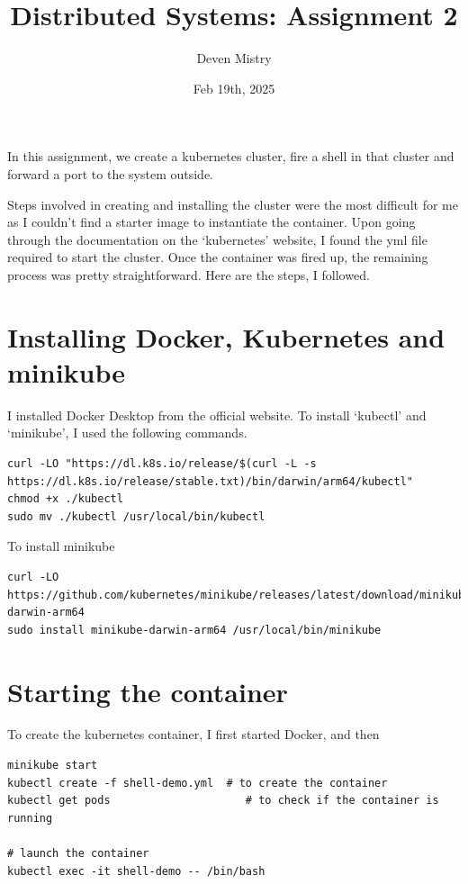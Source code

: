 \documentclass{article}
\title{Distributed Systems: Assignment 2}
\author{Deven Mistry}
\date{Feb 19th, 2025}
\begin{document}
\maketitle

In this assignment, we create a kubernetes cluster, fire a shell in that cluster and forward a port to the system outside.

Steps involved in creating and installing the cluster were the most difficult for me as I couldn't find a starter image to instantiate the container. Upon going through the documentation on the `kubernetes' website, I found the yml file required to start the cluster. Once the container was fired up, the remaining process was pretty straightforward. Here are the steps, I followed.



\section*{Installing Docker, Kubernetes and minikube}

I installed Docker Desktop from the official website. To install `kubectl' and `minikube', I used the following commands.

\begin{lstlisting}
curl -LO "https://dl.k8s.io/release/$(curl -L -s https://dl.k8s.io/release/stable.txt)/bin/darwin/arm64/kubectl"
chmod +x ./kubectl
sudo mv ./kubectl /usr/local/bin/kubectl
\end{lstlisting}

To install minikube

\begin{lstlisting}
curl -LO https://github.com/kubernetes/minikube/releases/latest/download/minikube-darwin-arm64
sudo install minikube-darwin-arm64 /usr/local/bin/minikube
\end{lstlisting}

\section*{Starting the container}

To create the kubernetes container, I first started Docker, and then

\begin{lstlisting}
minikube start
kubectl create -f shell-demo.yml  # to create the container
kubectl get pods                     # to check if the container is running

# launch the container
kubectl exec -it shell-demo -- /bin/bash
\end{lstlisting}
\end{document}
